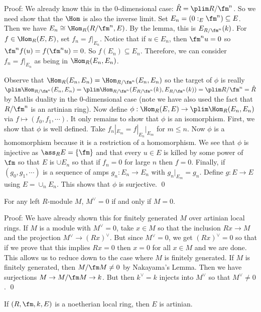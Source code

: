 \noindent Proof: We already know this in the 0-dimensional case: $\hat{R}= \plim R/\fm^n$. So we need show that the $\Hom$ is also the inverse limit. Set $E_n=(0:_E \fm^n) \subseteq E$. Then we have $E_n \cong \Hom_R(R/\fm^n,E)$. By the lemma, this is $E_{R/\fm^n}(k)$. For $f \in \Hom_R(E,E)$, set $f_n=f|_{E_n}$. Notice that if $u \in E_n$, then $\fm^nu=0$ so $\fm^nf(u)=f(\fm^nu)=0$. So $f(E_n) \subseteq E_n$. Therefore, we can consider $f_n=f|_{E_n}$ as being in $\Hom_R(E_n,E_n)$. 

Observe that $\Hom_R(E_n,E_n)=\Hom_{R/\fm^n}(E_n,E_n)$ so the target of $\phi$ is really $\plim \Hom_{R/\fm^n}(E_n,E_n)=\plim \Hom_{R/\fm^n}(E_{R/\fm^n}(k),E_{R/\fm^n}(k))=\plim R/\fm^n=\hat{R}$ by Matlis duality in the 0-dimensional case (note we have also used the fact that $R/\fm^n$ is an artinian ring). Now define $\phi: \Hom_R(E,E) \to \plim \Hom_R(E_n,E_n)$ via $f \mapsto (f_0,f_1,\cdots)$. It only remains to show that $\phi$ is an isomorphism. First, we show that $\phi$ is well defined. Take $f_n|_{E_m}=f|_{E_n}|_{E_m}$ for $m \leq n$. Now $\phi$ is a homomorphism because it is a restriction of a homomorphism. We see that $\phi$ is injective as $\ass_R E=\{\fm\}$ and that every $u \in E$ is killed by some power of $\fm$ so that $E$ is $\cup E_n$ so that if $f_n=0$ for large $n$ then $f=0$. Finally, if $(g_0,g_1,\cdots)$ is a sequence of amps $g_n: E_n \to E_n$ with $g_n|_{E_m}=g_n$. Define $g: E \to E$ using $E=\cup_n E_n$. This shows that $\phi$ is surjective. \qed \\

\begin{lem}
For any left $R$-module $M$, $M^\vee=0$ if and only if $M=0$. 
\end{lem}

\noindent Proof: We have already shown this for finitely generated $M$ over artinian local rings. If $M$ is a module with $M^\vee=0$, take $x \in M$ so that the inclusion $Rx \to M$ and the projection $M^\vee \to (Rx)^\vee$. But since $M^\vee=0$, we get $(Rx)^\vee=0$ so that if we prove that this implies $Rx=0$ then $x=0$ for all $x \in M$ and we are done. This allows us to reduce down to the case where $M$ is finitely generated. If $M$ is finitely generated, then $M/\fm M\neq 0$ by Nakayama's Lemma. Then we have surjections $M \to M/\fm M \to k$. But then $k^\vee=k$ injects into $M^\vee$ so that $M^\vee \neq 0$. \qed \\

\begin{lem}
If $(R,\fm,k,E)$ is a noetherian local ring, then $E$ is artinian. 
\end{lem}

